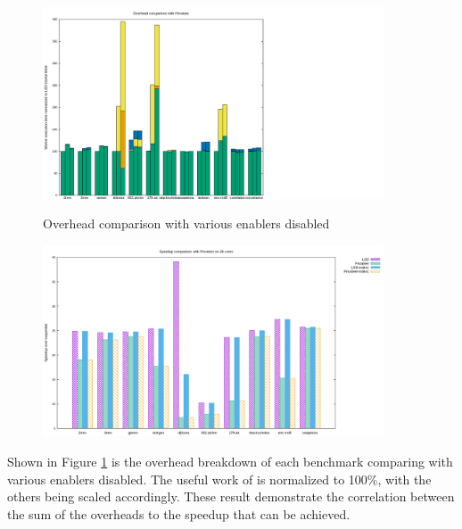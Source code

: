 \begin{figure}[htp]
  \includegraphics[width=0.9\textwidth]{figures/overheads}
  \label{fig:overheads}
  \caption{Overhead comparison with various enablers disabled}
\end{figure}
\begin{figure}[htp]
  \includegraphics[width=0.9\textwidth]{figures/comparison}
\end{figure}
Shown in Figure \ref{fig:overheads} is the overhead breakdown of each
benchmark comparing \name with various enablers disabled. The useful work
of \name is normalized to 100\%, with the others being scaled accordingly.
These result demonstrate the correlation between the sum of the overheads
to the speedup that can be achieved.

